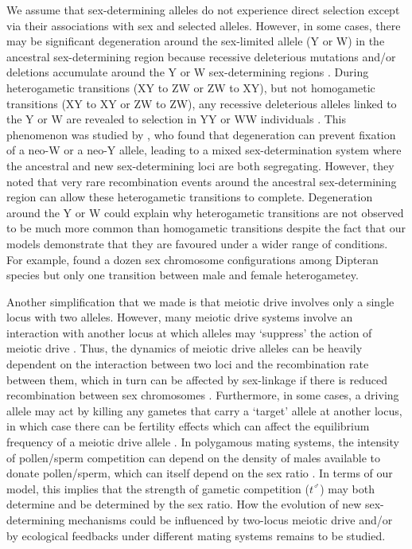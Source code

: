 \documentclass[12pt]{article}
\begin{document}
We assume that sex-determining alleles do not experience direct selection except via their associations with sex and selected alleles.
However, in some cases, there may be significant degeneration around the sex-limited allele (Y or W) in the ancestral sex-determining region because recessive deleterious mutations and/or deletions accumulate around the Y or W sex-determining regions \citep{Rice:1996ke,Charlesworth:2000cc,Bachtrog:2006ed,Marais:2008hm}. 
During heterogametic transitions (XY to ZW or ZW to XY), but not homogametic transitions (XY to XY or ZW to ZW), any recessive deleterious alleles linked to the Y or W are revealed to selection in YY or WW individuals \citep{Bachtrog:2014bx}. 
This phenomenon was studied by \citet{vanDoorn:2010hu}, who found that degeneration can prevent fixation of a neo-W or a neo-Y allele, leading to a mixed sex-determination system where the ancestral and new sex-determining loci are both segregating. 
However, they noted that very rare recombination events around the ancestral sex-determining region can allow these heterogametic transitions to complete.  
Degeneration around the Y or W could explain why heterogametic transitions are not observed to be much more common than homogametic transitions despite the fact that our models demonstrate that they are favoured under a wider range of conditions. 
For example, \citet{Vicoso:2015hf} found a dozen sex chromosome configurations among Dipteran species but only one transition between male and female heterogametey. 

Another simplification that we made is that meiotic drive involves only a single locus with two alleles. 
However, many meiotic drive systems involve an interaction with another locus at which alleles may `suppress' the action of meiotic drive \citep[][]{Burt:2006,Lindholm:2016cw}.
Thus, the dynamics of meiotic drive alleles can be heavily dependent on the interaction between two loci and the recombination rate between them, which in turn can be affected by sex-linkage if there is reduced recombination between sex chromosomes \citep{Hurst:1991uh}.
Furthermore, in some cases, a driving allele may act by killing any gametes that carry a `target' allele at another locus, in which case there can be fertility effects which can affect the equilibrium frequency of a meiotic drive allele \citep{Holman:2015en}. 
In polygamous mating systems, the intensity of pollen/sperm competition can depend on the density of males available to donate pollen/sperm, which can itself depend on the sex ratio \citep{Taylor:2002wu}. 
In terms of our model, this implies that the strength of gametic competition ($t^\male$) may both determine and be determined by the sex ratio. 
How the evolution of new sex-determining mechanisms could be influenced by two-locus meiotic drive and/or by ecological feedbacks under different mating systems remains to be studied.
\end{document}
